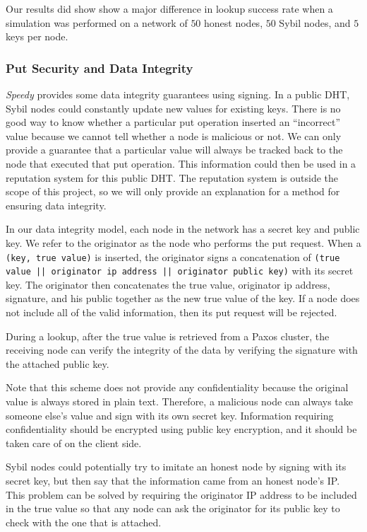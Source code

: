 \documentclass[letter]{article}
\newcommand{\sys}{\textit{Speedy}}
\begin{document}
Our results did show show a major difference in lookup success rate when a simulation was performed on a network of $50$ honest nodes, $50$ Sybil nodes, and $5$ keys per node.

\subsubsection{Put Security and Data Integrity}
\sys{} provides some data integrity guarantees using signing. In a public DHT, Sybil nodes could constantly update
new values for existing keys. There is no good way to know whether a particular
put operation inserted an ``incorrect'' value because we cannot tell whether
a node is malicious or not. We can only provide a guarantee that a particular
value will always be tracked back to the node that executed that put operation.
This information could then be used in a reputation system for this public DHT.
The reputation system is outside the scope of this project, so we will only
provide an explanation for a method for ensuring data integrity.

In our data integrity model,
each node in the network has a secret key and public key. We refer to the originator as the node who performs the put request. When a \texttt{(key, true value)} is inserted, the originator signs a concatenation of \texttt{(true value || originator ip address || originator public key)} with its secret key.
The originator then concatenates the true value, originator ip address, signature, and his public together as the new true value of the key.
If a node does not include all of the valid information, then its put request will be rejected.

During a lookup, after the true value is retrieved from a Paxos cluster, the receiving node can verify the integrity of the data by verifying the signature with the attached public key.

Note that this scheme does not provide any confidentiality because the original value
is always stored in plain text. Therefore, a malicious node can always take someone else's value and sign with its own secret key. Information requiring confidentiality should be
encrypted using public key encryption, and it should be taken care of on the client side.

Sybil nodes could potentially try to imitate an honest node by signing with its secret key,
but then say that the information came from an honest node's IP. This problem can be solved by
requiring the originator IP address to be included in the true value so that any node can ask the originator for its public key to check with the one that is attached.
\end{document}
